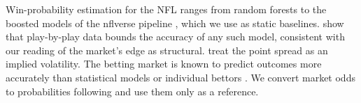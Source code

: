 Win-probability estimation for the NFL ranges from random forests \citep{lock2014} to the boosted models
of the nflverse pipeline \citep{yurko2018, nflfastr}, which we use as static baselines. \citet{brill2024}
show that play-by-play data bounds the accuracy of any such model, consistent with our reading of the
market's edge as structural. \citet{polson2015} treat the point spread as an implied volatility. The
betting market is known to predict outcomes more accurately than statistical models or individual bettors
\citep{boulier2003, levitt2004, franck2010, cox2021}. We convert market odds to probabilities following
\citet{strumbelj2014} and use them only as a reference.
